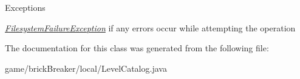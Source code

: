 \begin{DoxyExceptions}{Exceptions}
\item[{\em \hyperlink{classbrick_breaker_1_1local_1_1_filesystem_failure_exception}{FilesystemFailureException}}]if any errors occur while attempting the operation \end{DoxyExceptions}


The documentation for this class was generated from the following file:\begin{DoxyCompactItemize}
\item 
game/brickBreaker/local/LevelCatalog.java\end{DoxyCompactItemize}
